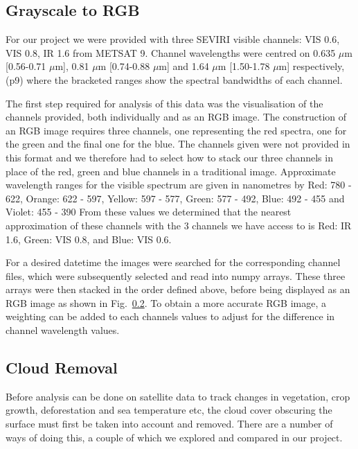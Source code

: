 \subsection{Grayscale to RGB}
For our project we were provided with three SEVIRI visible channels: VIS 0.6, VIS 0.8, IR 1.6 %
from METSAT 9. Channel wavelengths were centred on 0.635 $\mu$m [0.56-0.71 $\mu$m], 0.81 $\mu$m [0.74-0.88 $\mu$m] and 1.64 $\mu$m [1.50-1.78 $\mu$m] respectively, (p9) where the bracketed ranges show the spectral bandwidths of each channel. 
\par The first step required for analysis of this data was the visualisation of the channels provided, both individually and as an RGB image. The construction of an RGB image requires three channels, one representing the red spectra, one for the green and the final one for the blue. The channels given were not provided in this format and we therefore had to select how to stack our three channels in place of the red, green and blue channels in a traditional image. Approximate wavelength ranges for the visible spectrum are given in nanometres by Red: 780 - 622, Orange: 622 - 597, Yellow: 597 - 577, Green: 577 - 492, Blue: 492 - 455 and Violet: 455 - 390 %
From these values we determined that the nearest approximation of these channels with the 3 channels we have access to is Red: IR 1.6, Green: VIS 0.8, and Blue: VIS 0.6. 
\par For a desired datetime the images were searched for the corresponding channel files, which were subsequently selected and read into numpy arrays. These three arrays were then stacked in the order defined above, before being displayed as an RGB image as shown in Fig.~\ref{}. To obtain a more accurate RGB image, a weighting can be added to each channels values to adjust for the difference in channel wavelength values. 
\subsection{Cloud Removal}
 Before analysis can be done on satellite data to track changes in vegetation, crop growth, deforestation and sea temperature etc, the cloud cover obscuring the surface must first be taken into account and removed. There are a number of ways of doing this, a couple of which we explored and compared in our project. 
